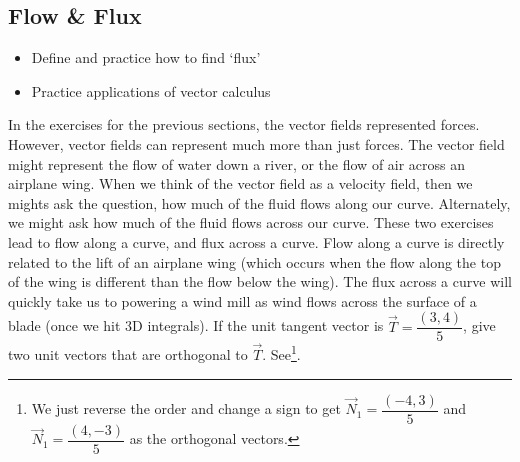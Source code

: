 \documentclass[10pt,]{book}
\theoremstyle{plain}
\theoremstyle{definition}
\theoremstyle{definition}
\theoremstyle{definition}
\theoremstyle{definition}
\theoremstyle{definition}
\numberwithin{equation}{section}
\begin{document}
\subsection[{Flow \& Flux}]{Flow \& Flux}\label{subsection-28}
\leavevmode%
\begin{itemize}[label=\textbullet]
\item{}Define and practice how to find `flux'%
\item{}Practice applications of vector calculus%
\end{itemize}
In the exercises for the previous sections, the vector fields represented forces. However, vector fields can represent much more than just forces. The vector field might represent the flow of water down a river, or the flow of air across an airplane wing. When we think of the vector field as a velocity field, then we mights ask the question, how much of the fluid flows along our curve. Alternately, we might ask how much of the fluid flows across our curve. These two exercises lead to flow along a curve, and flux across a curve. Flow along a curve is directly related to the lift of an airplane wing (which occurs when the flow along the top of the wing is different than the flow below the wing). The flux across a curve will quickly take us to powering a wind mill as wind flows across the surface of a blade (once we hit 3D integrals).%
If the unit tangent vector is \(\vec T = \dfrac{(3,4)}{5}\), give two unit vectors that are orthogonal to \(\vec T\). See\footnote{We just reverse the order and change a sign to get \(\vec N_1 = \dfrac{(-4,3)}{5}\) and \(\vec N_1 = \dfrac{(4,-3)}{5}\) as the orthogonal vectors.\label{fn-19}}.%
\end{document}

